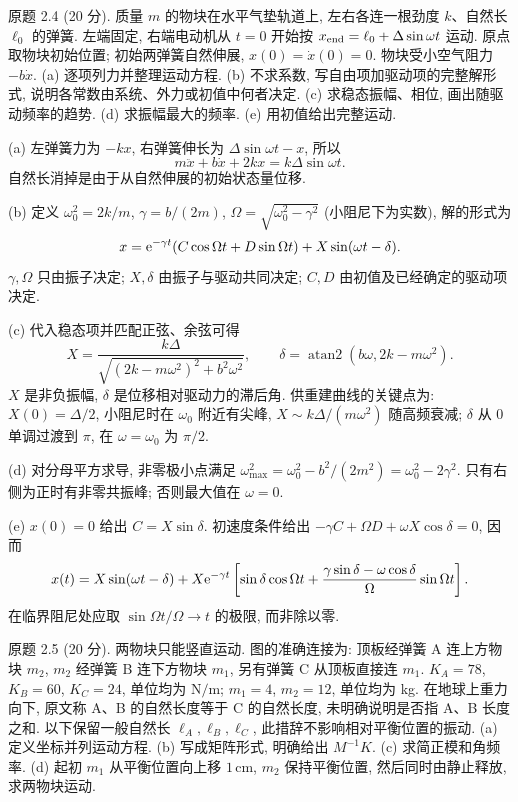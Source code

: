 \begin{exercise}\label{ps:2.4}
原题 2.4 (20 分). 质量 $m$ 的物块在水平气垫轨道上, 左右各连一根劲度 $k$、自然长 $\ell_0$ 的弹簧. 左端固定, 右端电动机从 $t=0$ 开始按 $x_{\rm end}=\ell_0+\Delta\sin\omega t$ 运动. 原点取物块初始位置; 初始两弹簧自然伸展, $x(0)=\dot x(0)=0$. 物块受小空气阻力 $-b\dot x$. (a) 逐项列力并整理运动方程. (b) 不求系数, 写自由项加驱动项的完整解形式, 说明各常数由系统、外力或初值中何者决定. (c) 求稳态振幅、相位, 画出随驱动频率的趋势. (d) 求振幅最大的频率. (e) 用初值给出完整运动.
\end{exercise}
\begin{solution}
(a) 左弹簧力为 $-kx$, 右弹簧伸长为 $\Delta\sin\omega t-x$, 所以
\[
m\ddot x+b\dot x+2kx=k\Delta\sin\omega t.
\]
自然长消掉是由于从自然伸展的初始状态量位移.

(b) 定义 $\omega_0^2=2k/m$, $\gamma=b/(2m)$, $\Omega=\sqrt{\omega_0^2-\gamma^2}$ (小阻尼下为实数), 解的形式为
\[
x=\mathrm e^{-\gamma t}(C\cos\Omega t+D\sin\Omega t)+X\sin(\omega t-\delta).
\]
$\gamma,\Omega$ 只由振子决定; $X,\delta$ 由振子与驱动共同决定; $C,D$ 由初值及已经确定的驱动项决定.

(c) 代入稳态项并匹配正弦、余弦可得
\[
X=\frac{k\Delta}{\sqrt{(2k-m\omega^2)^2+b^2\omega^2}},\qquad
\delta=\operatorname{atan2}(b\omega,2k-m\omega^2).
\]
$X$ 是非负振幅, $\delta$ 是位移相对驱动力的滞后角. 供重建曲线的关键点为: $X(0)=\Delta/2$, 小阻尼时在 $\omega_0$ 附近有尖峰, $X\sim k\Delta/(m\omega^2)$ 随高频衰减; $\delta$ 从 $0$ 单调过渡到 $\pi$, 在 $\omega=\omega_0$ 为 $\pi/2$.

(d) 对分母平方求导, 非零极小点满足 $\omega_{\max}^2=\omega_0^2-b^2/(2m^2)=\omega_0^2-2\gamma^2$. 只有右侧为正时有非零共振峰; 否则最大值在 $\omega=0$.

(e) $x(0)=0$ 给出 $C=X\sin\delta$. 初速度条件给出 $-\gamma C+\Omega D+\omega X\cos\delta=0$, 因而
\[
x(t)=X\sin(\omega t-\delta)+X\mathrm e^{-\gamma t}\left[\sin\delta\cos\Omega t+\frac{\gamma\sin\delta-\omega\cos\delta}{\Omega}\sin\Omega t\right].
\]
在临界阻尼处应取 $\sin\Omega t/\Omega\to t$ 的极限, 而非除以零.
\end{solution}
\begin{exercise}\label{ps:2.5}
原题 2.5 (20 分). 两物块只能竖直运动. 图的准确连接为: 顶板经弹簧 A 连上方物块 $m_2$, $m_2$ 经弹簧 B 连下方物块 $m_1$, 另有弹簧 C 从顶板直接连 $m_1$. $K_A=78$, $K_B=60$, $K_C=24$, 单位均为 $\mathrm{N/m}$; $m_1=4$, $m_2=12$, 单位均为 kg. 在地球上重力向下, 原文称 A、B 的自然长度等于 C 的自然长度, 未明确说明是否指 A、B 长度之和. 以下保留一般自然长 $\ell_A,\ell_B,\ell_C$, 此措辞不影响相对平衡位置的振动. (a) 定义坐标并列运动方程. (b) 写成矩阵形式, 明确给出 $M^{-1}K$. (c) 求简正模和角频率. (d) 起初 $m_1$ 从平衡位置向上移 $1\,\mathrm{cm}$, $m_2$ 保持平衡位置, 然后同时由静止释放, 求两物块运动.
\end{exercise}
